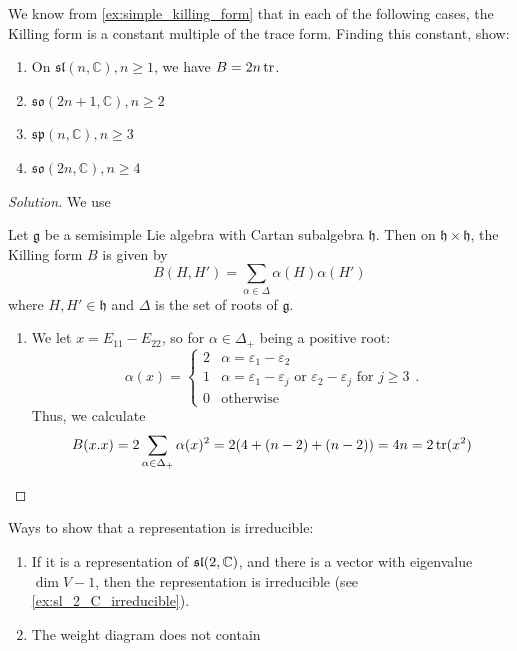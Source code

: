\documentclass{report}
\begin{document}
\begin{exercise}[Exercise II.1]
We know from \cref{ex:simple_killing_form} that in each of the following cases, the Killing form is a constant multiple of the trace form.
Finding this constant, show: 
\begin{enumerate}[label = (\roman*)]
    \item On $\mathfrak{sl}(n, \mathbb C), n\geq 1$, we have $B = 2n \operatorname{tr}$.
    \item $\mathfrak{so}(2n+1, \mathbb C), n\geq 2$
    \item $\mathfrak{sp}(n, \mathbb C), n \geq 3$
    \item $\mathfrak{so}(2n, \mathbb C), n \geq 4$
\end{enumerate} 
\end{exercise}
\begin{proof}[Solution]
    We use 
    \begin{lemma}
        Let $\mathfrak g$ be a semisimple Lie algebra with Cartan subalgebra $\mathfrak h$.
        Then on $\mathfrak h \times \mathfrak h$, the Killing form $B$ is given by
        \[
        B(H,H') = \sum_{\alpha \in \Delta} \alpha(H) \alpha(H')
        \]
        where $H, H' \in \mathfrak h$ and $\Delta$ is the set of roots of $\mathfrak g$.
    \end{lemma}
    \begin{enumerate}[label = (\roman*)]
        \item We let $x = E_{11} - E_{22}$, so for $\alpha \in \Delta_+$ being a positive root:
        \[
        \alpha(x) = \begin{cases}
            2 & \alpha = \varepsilon_1 - \varepsilon_2\\
            1 & \alpha = \varepsilon_1 - \varepsilon_j \text{ or } \varepsilon_2 - \varepsilon_j \text{ for } j \geq 3\\
            0 & \text{otherwise}
        \end{cases}.
        \] 
        Thus, we calculate
        \[
        B(x.x) = 2 \sum_{\alpha \in \Delta_+} \alpha(x)^2 = 2(4 + (n-2) + (n-2)) = 4n = 2\operatorname{tr}(x^2)
        \]
    \end{enumerate}
\end{proof}
\begin{remark}
    Ways to show that a representation is irreducible:
    \begin{enumerate}[label = (\roman*)]
        \item If it is a representation of $\operatorname{{\mathfrak{sl}}}(2, \mathbb C)$, and there is a vector with eigenvalue $\dim V - 1$, then the representation is irreducible (see \cref{ex:sl_2_C_irreducible}).
        \item The weight diagram does not contain 
    \end{enumerate}
\end{remark}
\end{document}
